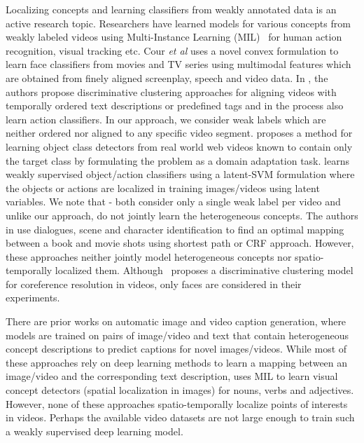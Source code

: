 \documentclass[runningheads]{llncs}
\begin{document}
 Localizing concepts and learning classifiers from weakly annotated data is an active research topic. Researchers have learned models for various concepts from weakly labeled videos using Multi-Instance Learning (MIL)~\cite{zhang2005multiple,andrews2002support} for human action recognition\cite{ali2010human}, visual tracking \cite{babenko2009visual} etc. Cour {\it et al} \cite{Cour:eccv08} uses a novel convex formulation to learn face classifiers from movies and TV series using multimodal features which are obtained from finely aligned screenplay, speech and video data. In \cite{bojanowski2015weakly,bojanowski2014weakly}, the authors propose discriminative clustering approaches for aligning videos with temporally ordered text descriptions or predefined tags and in the process also learn action classifiers. In our approach, we consider weak labels which are neither ordered nor aligned to any specific video segment. \cite{prest2012learning} proposes a method for learning object class detectors from real world web videos known to contain only the target class by formulating the problem as a domain adaptation task. \cite{bilen2014object} learns weakly supervised object/action classifiers using a latent-SVM formulation where the objects or actions are localized in training images/videos using latent variables. We note that - both \cite{prest2012learning,bilen2014object} consider only a single weak label per video and unlike our approach, do not jointly learn the heterogeneous concepts. The authors in \cite{tapaswi2015book2movie,zhu2015aligning} use dialogues, scene and character identification to find an optimal mapping between a book and movie shots using shortest path or CRF approach. However, these approaches neither jointly model heterogeneous concepts nor spatio-temporally localized them. Although~\cite{ramanathan2014linking} proposes a discriminative clustering model for coreference resolution in videos, only faces are considered in their experiments.

 There are prior works on automatic image \cite{karpathy2015deep,xu2015show,fang2015captions} and video \cite{venugopalan2015sequence,rohrbach2015long,cho2015describing} caption generation, where models are trained on pairs of image/video and text that contain heterogeneous concept descriptions to predict captions for novel images/videos. While most of these approaches rely on deep learning methods to learn a mapping between an image/video and the corresponding text description, \cite{fang2015captions} uses MIL to learn visual concept detectors (spatial localization in images) for nouns, verbs and adjectives. However, none of these approaches spatio-temporally localize points of interests in videos. Perhaps the available video datasets are not large enough to train such a weakly supervised deep learning model. 
\end{document}
